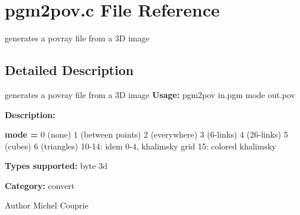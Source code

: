 \section{pgm2pov.c File Reference}
\label{pgm2pov_8c}


generates a povray file from a 3D image  




\subsection{Detailed Description}
generates a povray file from a 3D image {\bfseries Usage:} pgm2pov in.pgm mode out.pov

{\bfseries Description:}

{\bfseries mode = } 0 (none) 1 (between points) 2 (everywhere) 3 (6-\/links) 4 (26-\/links) 5 (cubes) 6 (triangles) 10-\/14: idem 0-\/4, khalimsky grid 15: colored khalimsky

{\bfseries Types supported:} byte 3d

{\bfseries Category:} convert

\begin{DoxyAuthor}{Author}
Michel Couprie 
\end{DoxyAuthor}
